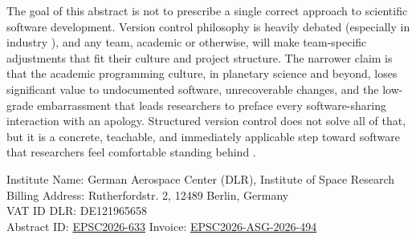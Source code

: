 \documentclass[11pt]{article}
\begin{document}
The goal of this abstract is not to prescribe a single correct approach to scientific software 
development. Version control philosophy is heavily debated (especially in industry \cite{driessen2010}), and any team,
academic or otherwise, will make team-specific adjustments that fit their culture and project structure. 
The narrower claim is that the academic programming culture, in planetary science and beyond, 
loses significant value to undocumented software, unrecoverable changes, and the low-grade embarrassment 
that leads researchers to preface every software-sharing interaction with an apology. 
Structured version control does not solve all of that, but it is a concrete, teachable, 
and immediately applicable step toward software that researchers feel comfortable standing behind \cite{ram2013,carver2022}.

\newpage

\printbibliography
Institute Name: German Aerospace Center (DLR), Institute of Space Research\\
Billing Address: Rutherfordstr. 2, 12489 Berlin, Germany\\
VAT ID DLR: DE121965658 \\
Abstract ID: \href{https://meetingorganizer.copernicus.org/EPSC2026/EPSC2026-633.html}{EPSC2026-633}
Invoice: \href{https://trader.copernicus.org/myorders/EPSC2026-ASG-2026-494}{ EPSC2026-ASG-2026-494}\\
\end{document}
